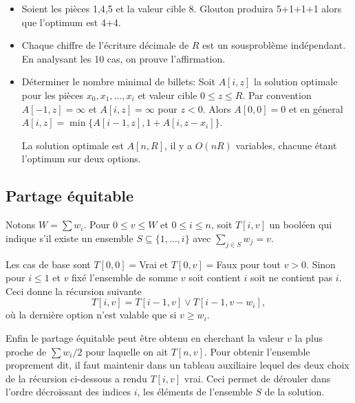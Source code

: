 \documentclass[12pt]{article}
\begin{document}
\begin{itemize}
    \item Soient les pièces 1,4,5 et la valeur cible 8. Glouton produira 5+1+1+1 alors que l'optimum est 4+4.
    \item Chaque chiffre de l'écriture décimale de $R$ est un sousproblème indépendant.  En analysant les 10 cas, on prouve l'affirmation.
    \item
    Déterminer le nombre minimal de billets: 
    Soit $A[i,z]$ la solution optimale pour les pièces $x_0,x_1,\ldots,x_i$ et valeur cible $0\leq z\leq R$.
    Par convention $A[-1,z]=\infty$ et $A[i,z]=\infty$ pour $z<0$.
    Alors $A[0,0]=0$ et en géneral $A[i,z]=\min\{A[i-1,z],1+A[i,z-x_i]\}$.  

    La solution optimale est $A[n,R]$, il y a $O(nR)$ variables, chacune étant l'optimum sur deux options. 
\end{itemize}

\subsection{Partage équitable}

Notons $W=\sum w_i$.  Pour $0\leq v \leq W$ et $0 \leq i \leq n$, soit $T[i,v]$ un booléen qui indique s'il existe un ensemble $S\subseteq \{1, \ldots, i\}$ avec $\sum_{j\in S} w_j = v$.

Les cas de base sont $T[0,0]=$Vrai et $T[0,v]=$Faux pour tout $v>0$.
Sinon pour $i \leq 1$ et $v$ fixé l'ensemble de somme $v$ soit contient $i$ soit ne contient pas $i$.  Ceci donne la récursion suivante
\[
		T[i,v] = T[i-1, v] \vee T[i-1, v - w_i],
\]
où la dernière option n'est valable que si $v \geq w_i$.

Enfin le partage équitable peut être obtenu en cherchant la valeur $v$ la plus proche de $\sum w_i /2$ pour laquelle on ait $T[n,v]$.  Pour obtenir l'ensemble proprement dit, il faut maintenir dans un tableau auxiliaire lequel des deux choix de la récursion ci-dessous a rendu $T[i,v]$ vrai. Ceci permet de dérouler dans l'ordre décroissant des indices $i$, les éléments de l'ensemble $S$ de la solution.
\end{document}
